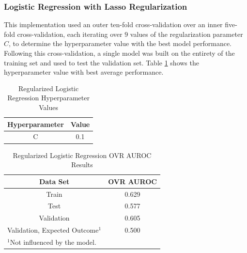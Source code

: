 \documentclass[conference]{IEEEtran}
\begin{document}
\subsubsection{Logistic Regression with Lasso Regularization}
This implementation used an outer ten-fold cross-validation over an inner five-fold cross-validation, each iterating over $9$ values of the regularization parameter $C$, to determine the hyperparameter value with the best model performance. Following this cross-validation, a single model was built on the entirety of the training set and used to test the validation set. Table \ref{tab8} shows the hyperparameter value with best average performance. 

\begin{table}[htbp]
\caption{Regularized Logistic Regression Hyperparameter Values}
\begin{center}
\begin{tabular}{|c||c|}
\hline
\textbf{Hyperparameter} & \textbf{Value} \\
\hline
\hline
C & 0.1 \\
\hline
\end{tabular}
\label{tab8}
\end{center}
\end{table}

\begin{table}[htbp]
\caption{Regularized Logistic Regression OVR AUROC Results}
\begin{center}
\begin{tabular}{|c||c|}
\hline
\textbf{Data Set} & \textbf{OVR AUROC} \\
\hline
\hline
Train & 0.629 \\
\hline
Test & 0.577 \\
\hline
Validation & 0.605 \\
\hline
Validation, Expected Outcome$^{\mathrm{1}}$ & 0.500 \\
\hline
\multicolumn{2}{l}{$^{\mathrm{1}}$Not influenced by the model.}
\end{tabular}
\label{tab9}
\end{center}
\end{table}
\end{document}
